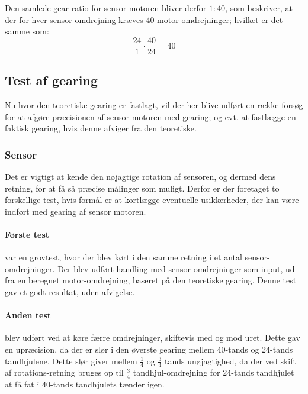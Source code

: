Den samlede gear ratio for sensor motoren bliver derfor $1:40$, som beskriver, at der for hver sensor omdrejning kræves 40 motor omdrejninger; hvilket er det samme som:
$$\frac{24}{1} \cdot \frac{40}{24} = 40$$

\subsection{Test af gearing}\label{robot:gearing-test}
Nu hvor den teoretiske gearing er fastlagt, vil der her blive udført en række forsøg for at afgøre præcisionen af sensor motoren med gearing; og evt. at fastlægge en faktisk gearing, hvis denne afviger fra den teoretiske.

\subsubsection{Sensor}
Det er vigtigt at kende den nøjagtige rotation af sensoren, og dermed dens retning, for at få så præcise målinger som muligt.
Derfor er der foretaget to forskellige test, hvis formål er at kortlægge eventuelle usikkerheder, der kan være indført med gearing af sensor motoren.

\paragraph{Første test} var en grovtest, hvor der blev kørt i den samme retning i et antal sensor-omdrejninger.
Der blev udført handling med sensor-omdrejninger som input, ud fra en beregnet motor-omdrejning, baseret på den teoretiske gearing.
Denne test gav et godt resultat, uden afvigelse.

\paragraph{Anden test} blev udført ved at køre færre omdrejninger, skiftevis med og mod uret.
Dette gav en upræcision, da der er slør i den øverste gearing mellem 40-tands og 24-tands tandhjulene.
Dette slør giver mellem $\frac{1}{4}$ og $\frac{3}{4}$ tands unøjagtighed, da der ved skift af rotations-retning bruges op til $\frac{3}{4}$ tandhjul-omdrejning for 24-tands tandhjulet at få fat i 40-tands tandhjulets tænder igen.
